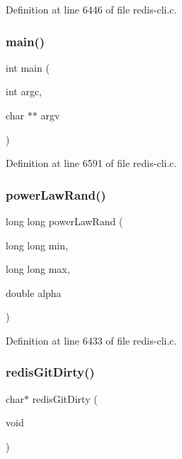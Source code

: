 Definition at line 6446 of file redis-\/cli.\+c.

\mbox{\label{redis-cli_8c_a3c04138a5bfe5d72780bb7e82a18e627}} 
\subsubsection{\texorpdfstring{main()}{main()}}
{\footnotesize\ttfamily int main (\begin{DoxyParamCaption}\item[{int}]{argc,  }\item[{char $\ast$$\ast$}]{argv }\end{DoxyParamCaption})}



Definition at line 6591 of file redis-\/cli.\+c.

\mbox{\label{redis-cli_8c_aadf73ba53c2fb2744ad04f967a34e39c}} 
\subsubsection{\texorpdfstring{power\+Law\+Rand()}{powerLawRand()}}
{\footnotesize\ttfamily long long power\+Law\+Rand (\begin{DoxyParamCaption}\item[{long long}]{min,  }\item[{long long}]{max,  }\item[{double}]{alpha }\end{DoxyParamCaption})}



Definition at line 6433 of file redis-\/cli.\+c.

\mbox{\label{redis-cli_8c_a1dc767d40b8708fecbc214aafd78fd71}} 
\subsubsection{\texorpdfstring{redis\+Git\+Dirty()}{redisGitDirty()}}
{\footnotesize\ttfamily char$\ast$ redis\+Git\+Dirty (\begin{DoxyParamCaption}\item[{void}]{ }\end{DoxyParamCaption})}



